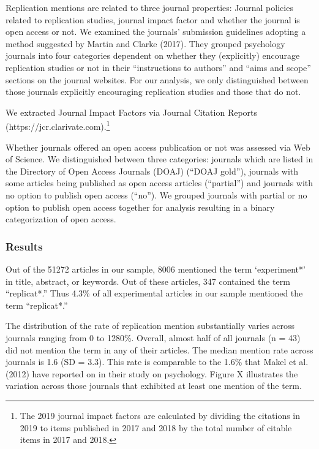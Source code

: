 \documentclass[]{elsarticle} %
\begin{document}
Replication mentions are related to three journal properties: Journal
policies related to replication studies, journal impact factor and
whether the journal is open access or not. We examined the journals'
submission guidelines adopting a method suggested by Martin and Clarke
(2017). They grouped psychology journals into four categories dependent
on whether they (explicitly) encourage replication studies or not in
their ``instructions to authors'' and ``aims and scope'' sections on the
journal websites. For our analysis, we only distinguished between those
journals explicitly encouraging replication studies and those that do
not.

We extracted Journal Impact Factors via Journal Citation Reports
(https://jcr.clarivate.com).\footnote{The 2019 journal impact factors
  are calculated by dividing the citations in 2019 to items published in
  2017 and 2018 by the total number of citable items in 2017 and 2018.}

Whether journals offered an open access publication or not was assessed
via Web of Science. We distinguished between three categories: journals
which are listed in the Directory of Open Access Journals (DOAJ) (``DOAJ
gold''), journals with some articles being published as open access
articles (``partial'') and journals with no option to publish open
access (``no''). We grouped journals with partial or no option to
publish open access together for analysis resulting in a binary
categorization of open access.

\hypertarget{results}{%
\subsubsection{Results}\label{results}}

Out of the 51272 articles in our sample, 8006 mentioned the term
`experiment*' in title, abstract, or keywords. Out of these articles,
347 contained the term ``replicat*.'' Thus 4.3\% of all experimental
articles in our sample mentioned the term ``replicat*.''

The distribution of the rate of replication mention substantially varies
across journals ranging from 0 to 1280\%. Overall, almost half of all
journals (n = 43) did not mention the term in any of their articles. The
median mention rate across journals is 1.6 (SD = 3.3). This rate is
comparable to the 1.6\% that Makel et al. (2012) have reported on in
their study on psychology. Figure X illustrates the variation across
those journals that exhibited at least one mention of the term.
\end{document}
